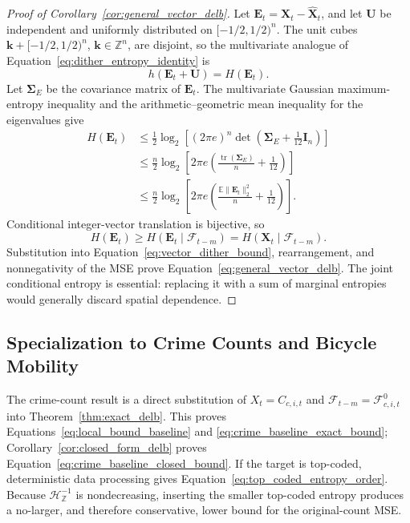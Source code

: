 \begin{proof}[Proof of Corollary~\ref{cor:general_vector_delb}]
Let
\(\mathbf{E}_t=\mathbf{X}_t-\widehat{\mathbf{X}}_t\), and let
\(\mathbf{U}\) be independent and uniformly distributed on
\([-1/2,1/2)^n\). The unit cubes
\(\mathbf{k}+[-1/2,1/2)^n\), \(\mathbf{k}\in\mathbb{Z}^n\), are disjoint,
so the multivariate analogue of
Equation~\eqref{eq:dither_entropy_identity} is
\[
h(\mathbf{E}_t+\mathbf{U})=H(\mathbf{E}_t).
\]
Let \(\boldsymbol{\Sigma}_E\) be the covariance matrix of
\(\mathbf{E}_t\). The multivariate Gaussian maximum-entropy inequality and
the arithmetic--geometric mean inequality for the eigenvalues give
\begin{align}
H(\mathbf{E}_t)
&\leq
\frac{1}{2}\log_2\!\left[
(2\pi e)^n
\det\!\left(\boldsymbol{\Sigma}_E+\frac{1}{12}\mathbf{I}_n\right)
\right]
\nonumber\\
&\leq
\frac{n}{2}\log_2\!\left[
2\pi e
\left(
\frac{\operatorname{tr}(\boldsymbol{\Sigma}_E)}{n}
+
\frac{1}{12}
\right)
\right]
\nonumber\\
&\leq
\frac{n}{2}\log_2\!\left[
2\pi e
\left(
\frac{\mathbb{E}\|\mathbf{E}_t\|_2^2}{n}
+
\frac{1}{12}
\right)
\right].
\label{eq:vector_dither_bound}
\end{align}
Conditional integer-vector translation is bijective, so
\[
H(\mathbf{E}_t)
\geq
H(\mathbf{E}_t\mid\mathcal{F}_{t-m})
=
H(\mathbf{X}_t\mid\mathcal{F}_{t-m}).
\]
Substitution into Equation~\eqref{eq:vector_dither_bound}, rearrangement,
and nonnegativity of the MSE prove
Equation~\eqref{eq:general_vector_delb}. The joint conditional entropy is
essential: replacing it with a sum of marginal entropies would generally
discard spatial dependence.
\end{proof}

\subsection{Specialization to Crime Counts and Bicycle Mobility}

The crime-count result is a direct substitution of
\(X_t=C_{c,i,t}\) and
\(\mathcal{F}_{t-m}=\mathcal{F}^{0}_{c,i,t}\) into
Theorem~\ref{thm:exact_delb}. This proves
Equations~\eqref{eq:local_bound_baseline} and
\eqref{eq:crime_baseline_exact_bound}; Corollary~\ref{cor:closed_form_delb}
proves Equation~\eqref{eq:crime_baseline_closed_bound}. If the target is
top-coded, deterministic data processing gives
Equation~\eqref{eq:top_coded_entropy_order}. Because
\(\mathcal{H}_{\mathbb{Z}}^{-1}\) is nondecreasing, inserting the smaller
top-coded entropy produces a no-larger, and therefore conservative, lower
bound for the original-count MSE.

